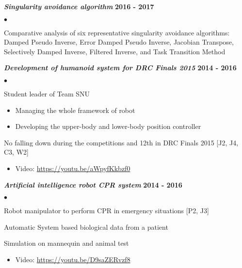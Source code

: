 \documentclass[margin,line]{res}
\newenvironment{list2}{
  \begin{list}{$\bullet$}{%
      \setlength{\itemsep}{0in}
      \setlength{\parsep}{0in} \setlength{\parskip}{0in}
      \setlength{\topsep}{0in} \setlength{\partopsep}{0in} 
      \setlength{\leftmargin}{0.2in}}}{\end{list}}
\begin{document}
\begin{resume}
  \textbf{\emph {Singularity avoidance algorithm}} \hfill {\bf 2016  - 2017}
  \begin{list2}
    \item Comparative analysis of six representative singularity avoidance algorithms:
    \\ Damped Pseudo Inverse, Error Damped Pseudo Inverse, Jacobian Transpose, Selectively Damped Inverse, Filtered Inverse, and Task Transition Method
  \end{list2}

  \textbf{\emph { Development of humanoid system for DRC Finals 2015}} \hfill {\bf 2014  - 2016}
  \begin{list2}
    \item {Student leader} of Team SNU
    \begin{itemize}
      \vspace*{-.05in}
      \item[\checkmark] Managing the whole framework of robot
            \vspace*{-.05in}
      \item[\checkmark] Developing the upper-body and lower-body position controller
            \vspace*{-.05in}
    \end{itemize}
    \item No falling down during the competitions and 12th in DRC Finals 2015 [J2, J4, C3, W2]
    \begin{itemize}
      \vspace*{-.05in}
      \item[\checkmark] Video: \url{https://youtu.be/aWpyfKkbzf0}
            \vspace*{-.05in}
    \end{itemize}
  \end{list2}

  \textbf{\emph { Artificial intelligence robot CPR system}} \hfill {\bf 2014  - 2016}
  \begin{list2}
    \item Robot manipulator to perform CPR in emergency situations [P2, J3]
    \item Automatic System based biological data from a patient
    \item Simulation on mannequin and animal test
    \begin{itemize}
      \vspace*{-.05in}
      \item[\checkmark] Video: \url{https://youtu.be/D9saZERvzf8}
            \vspace*{-.05in}
    \end{itemize}
  \end{list2}


\end{resume}
\end{document}
